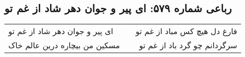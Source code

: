 \begin{center}
\section*{رباعی شماره ۵۷۹: ای پیر و جوان دهر شاد از غم تو}
\label{sec:sh579}
\begin{longtable}{l p{0.5cm} r}
ای پیر و جوان دهر شاد از غم تو
&&
فارغ دل هیچ کس مباد از غم تو
\\
مسکین من بیچاره درین عالم خاک
&&
سرگردانم چو گرد باد از غم تو
\\
\end{longtable}
\end{center}
